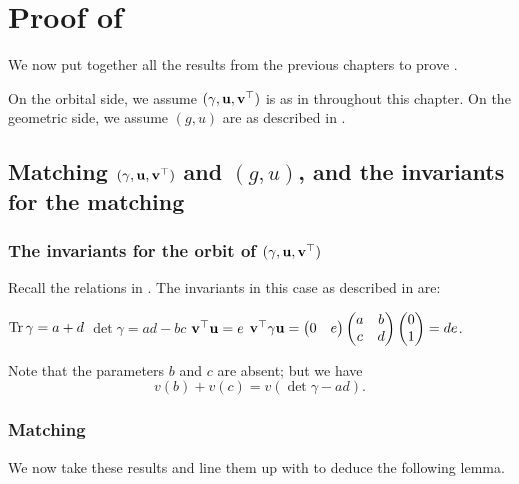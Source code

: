 \section{Proof of }
\label{ch:finale}
We now put together all the results from the previous chapters to
prove .

On the orbital side, we assume ${(\gamma, \mathbf u, \mathbf v^\top)}$ is as in  throughout this chapter.
On the geometric side, we assume $(g,u)$ are as described in .

\subsection{Matching ${(\gamma, \mathbf u, \mathbf v^\top)}$ and $(g,u)$, and the invariants for the matching}
\subsubsection{The invariants for the orbit of ${(\gamma, \mathbf u, \mathbf v^\top)}$}
Recall the relations in .
The invariants in this case as described in  are:
\begin{itemize}
  \ii $\operatorname{Tr} \gamma = a + d$
  \ii $\det \gamma = ad - bc$
  \ii $\mathbf v^\top \mathbf u = e$
  \ii $\mathbf v^\top \gamma \mathbf u = \begin{pmatrix} 0 & e \end{pmatrix}
  \begin{pmatrix} a & b \\ c & d \end{pmatrix} \begin{pmatrix} 0 \\ 1 \end{pmatrix} = de$.
\end{itemize}
Note that the parameters $b$ and $c$ are absent; but we have
\[ v(b) + v(c) = v(\det \gamma - a d). \]

\subsubsection{Matching}
We now take these results and line them up with 
to deduce the following lemma.

